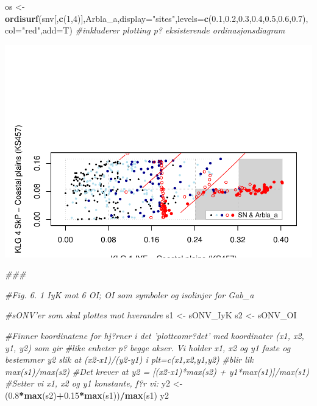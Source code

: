 \documentclass[]{article}
\newenvironment{Shaded}{\begin{snugshade}}{\end{snugshade}}
\newcommand{\CommentTok}[1]{\textcolor[rgb]{0.56,0.35,0.01}{\textit{#1}}}
\newcommand{\DataTypeTok}[1]{\textcolor[rgb]{0.13,0.29,0.53}{#1}}
\newcommand{\DecValTok}[1]{\textcolor[rgb]{0.00,0.00,0.81}{#1}}
\newcommand{\FloatTok}[1]{\textcolor[rgb]{0.00,0.00,0.81}{#1}}
\newcommand{\KeywordTok}[1]{\textcolor[rgb]{0.13,0.29,0.53}{\textbf{#1}}}
\newcommand{\NormalTok}[1]{#1}
\newcommand{\OperatorTok}[1]{\textcolor[rgb]{0.81,0.36,0.00}{\textbf{#1}}}
\newcommand{\StringTok}[1]{\textcolor[rgb]{0.31,0.60,0.02}{#1}}
\begin{document}
\begin{Shaded}
\begin{Highlighting}[]
\NormalTok{os <-}\StringTok{ }\KeywordTok{ordisurf}\NormalTok{(snv[,}\KeywordTok{c}\NormalTok{(}\DecValTok{1}\NormalTok{,}\DecValTok{4}\NormalTok{)],Arbla_a,}\DataTypeTok{display=}\StringTok{"sites"}\NormalTok{,}\DataTypeTok{levels=}\KeywordTok{c}\NormalTok{(}\FloatTok{0.1}\NormalTok{,}\FloatTok{0.2}\NormalTok{,}\FloatTok{0.3}\NormalTok{,}\FloatTok{0.4}\NormalTok{,}\FloatTok{0.5}\NormalTok{,}\FloatTok{0.6}\NormalTok{,}\FloatTok{0.7}\NormalTok{), }\DataTypeTok{col=}\StringTok{"red"}\NormalTok{,}\DataTypeTok{add=}\NormalTok{T) }\CommentTok{#inkluderer plotting p? eksisterende ordinasjonsdiagram}
\end{Highlighting}
\end{Shaded}

\includegraphics{Landscape_analysis_example_4_files/figure-latex/unnamed-chunk-52-1.pdf}

\begin{Shaded}
\begin{Highlighting}[]
\CommentTok{###}

\CommentTok{#Fig. 6. 1 IyK mot 6 OI; OI som symboler og isolinjer for Gab_a}

\CommentTok{#sONV'er som skal plottes mot hverandre}
\NormalTok{s1 <-}\StringTok{ }\NormalTok{sONV_IyK}
\NormalTok{s2 <-}\StringTok{ }\NormalTok{sONV_OI}

\CommentTok{#Finner koordinatene for hj?rner i det 'plotteomr?det' med koordinater (x1, x2, y1, y2) som gir}
\CommentTok{#like enheter p? begge akser. Vi holder x1, x2 og y1 faste og bestemmer y2 slik at (x2-x1)/(y2-y1) i plt=c(x1,x2,y1,y2)}
\CommentTok{#blir lik max(s1)/max(s2)}
\CommentTok{#Det krever at y2 = [(x2-x1)*max(s2) + y1*max(s1)]/max(s1) }
\CommentTok{#Setter vi x1, x2 og y1 konstante, f?r vi:}
\NormalTok{y2 <-}\StringTok{ }\NormalTok{(}\FloatTok{0.8}\OperatorTok{*}\KeywordTok{max}\NormalTok{(s2)}\OperatorTok{+}\FloatTok{0.15}\OperatorTok{*}\KeywordTok{max}\NormalTok{(s1))}\OperatorTok{/}\KeywordTok{max}\NormalTok{(s1)}
\NormalTok{y2}
\end{Highlighting}
\end{Shaded}
\end{document}
